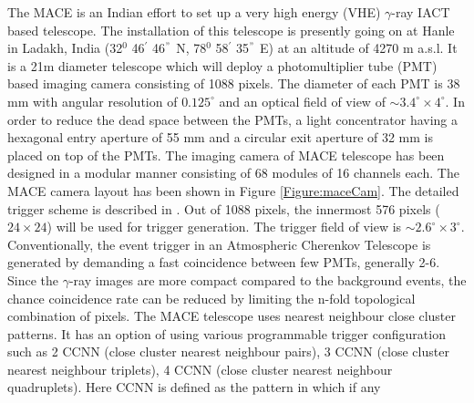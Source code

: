 \documentclass[preprint,12pt]{elsarticle}
\begin{document}
The MACE is an Indian effort to set up a very high energy (VHE) $\gamma$-ray IACT based telescope. The installation of this telescope
is presently going on at Hanle in Ladakh, India (32$^0$  46$^{'}$ 46$^{"}$ N, 78$^0$ 58$^{'}$ 35$^{"}$ E) at an altitude of 4270 m a.s.l. It is a 21m diameter 
telescope which will deploy a photomultiplier tube (PMT) based imaging camera consisting of 1088 pixels. %
The diameter of each PMT is 38 mm with angular resolution of $0.125^{\circ}$ and  an optical field of view 
of $\sim 3.4^{\circ} \times 4^{\circ}$. In order to reduce the dead space between the PMTs, a light concentrator having a hexagonal entry
aperture of 55 mm  and a circular exit aperture of 32 mm is placed on top of the PMTs. %
The imaging camera of MACE telescope has been designed in a modular manner consisting of 68 modules of 16 channels each. The MACE camera layout has been shown 
in Figure \ref{Figure:maceCam}. The detailed trigger scheme is described in \cite{chinmayB}. Out of 1088 pixels, the innermost 576 pixels ($24 \times 24$) will be used for 
trigger generation. The trigger field of view is $\sim 2.6^{\circ} \times 3^{\circ}$. Conventionally, the event trigger in an Atmospheric Cherenkov Telescope is generated by 
demanding a fast coincidence between few PMTs, generally 2-6. Since the $\gamma$-ray images are more compact compared to the background events, the chance coincidence 
rate can be reduced by limiting the n-fold topological combination of pixels. The MACE telescope uses nearest neighbour close cluster 
patterns. It has an option of using various programmable trigger configuration such as 2 CCNN (close cluster nearest neighbour pairs), 3 CCNN (close cluster nearest 
neighbour triplets), 4 CCNN (close cluster nearest neighbour quadruplets). Here CCNN is defined as the pattern in which if any
\end{document}
